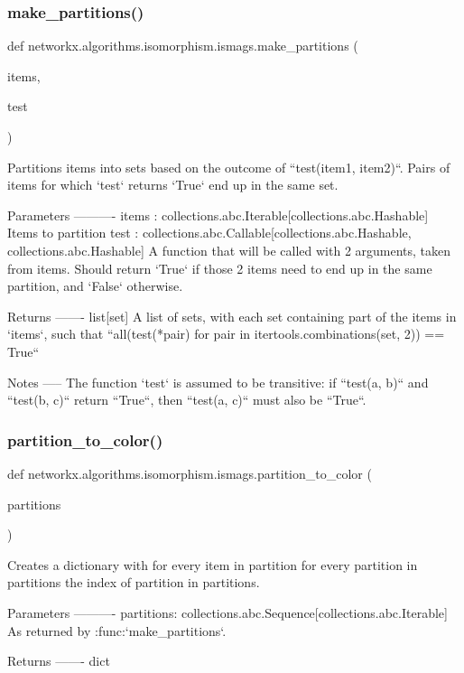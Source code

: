 \subsubsection{\texorpdfstring{make\+\_\+partitions()}{make\_partitions()}}
{\footnotesize\ttfamily def networkx.\+algorithms.\+isomorphism.\+ismags.\+make\+\_\+partitions (\begin{DoxyParamCaption}\item[{}]{items,  }\item[{}]{test }\end{DoxyParamCaption})}

\begin{DoxyVerb}Partitions items into sets based on the outcome of ``test(item1, item2)``.
Pairs of items for which `test` returns `True` end up in the same set.

Parameters
----------
items : collections.abc.Iterable[collections.abc.Hashable]
    Items to partition
test : collections.abc.Callable[collections.abc.Hashable, collections.abc.Hashable]
    A function that will be called with 2 arguments, taken from items.
    Should return `True` if those 2 items need to end up in the same
    partition, and `False` otherwise.

Returns
-------
list[set]
    A list of sets, with each set containing part of the items in `items`,
    such that ``all(test(*pair) for pair in  itertools.combinations(set, 2))
    == True``

Notes
-----
The function `test` is assumed to be transitive: if ``test(a, b)`` and
``test(b, c)`` return ``True``, then ``test(a, c)`` must also be ``True``.
\end{DoxyVerb}
 \mbox{\label{namespacenetworkx_1_1algorithms_1_1isomorphism_1_1ismags_a9231036839a88c188ab79f4f2b123362}} 
\subsubsection{\texorpdfstring{partition\+\_\+to\+\_\+color()}{partition\_to\_color()}}
{\footnotesize\ttfamily def networkx.\+algorithms.\+isomorphism.\+ismags.\+partition\+\_\+to\+\_\+color (\begin{DoxyParamCaption}\item[{}]{partitions }\end{DoxyParamCaption})}

\begin{DoxyVerb}Creates a dictionary with for every item in partition for every partition
in partitions the index of partition in partitions.

Parameters
----------
partitions: collections.abc.Sequence[collections.abc.Iterable]
    As returned by :func:`make_partitions`.

Returns
-------
dict
\end{DoxyVerb}
 